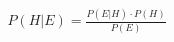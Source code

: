 \documentclass[preview]{standalone}
\begin{document}
\begin{align*}
P(H|E) = \frac{P(E|H) \cdot P(H)}{P(E)}
\end{align*}
\end{document}
